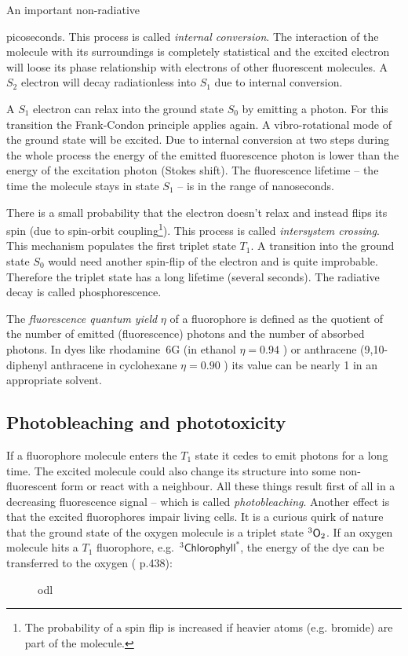 An important non-radiative 

picoseconds. This process is called \emph{internal conversion}. The
interaction of the molecule with its surroundings is completely
statistical and the excited electron will loose its phase relationship
with electrons of other fluorescent molecules. A $S_2$ electron will
decay radiationless into $S_1$ due to internal conversion.

A $S_1$ electron can relax into the ground state $S_0$ by emitting a
photon. For this transition the Frank-Condon principle applies
again. A vibro-rotational mode of the ground state will be excited.
Due to internal conversion at two steps during the whole process the
energy of the emitted fluorescence photon is lower than the energy of
the excitation photon (Stokes shift). The fluorescence lifetime -- the
time the molecule stays in state $S_1$ -- is in the range of
nanoseconds.

There is a small probability that the electron doesn't relax and
instead flips its spin (due to spin-orbit coupling\footnote{The
  probability of a spin flip is increased if heavier atoms
  (e.g. bromide) are part of the molecule.}). This process is called
\emph{intersystem crossing}. This mechanism populates the first
triplet state $T_1$. A transition into the ground state $S_0$ would
need another spin-flip of the electron and is quite
improbable. Therefore the triplet state has a long lifetime (several
seconds). The radiative decay is called phosphorescence.
  
The \emph{fluorescence quantum yield} $\eta$ of a fluorophore is
defined as the quotient of the number of emitted (fluorescence)
photons and the number of absorbed photons. In dyes like rhodamine~6G
(in ethanol $\eta=0.94$ \cite{Fischer1996}) or anthracene
(9,10-diphenyl anthracene in cyclohexane $\eta=0.90$ \cite{Hamai1983})
its value can be nearly 1 in an appropriate solvent.

\subsection{Photobleaching and phototoxicity}
    
If a fluorophore molecule enters the $T_1$ state it cedes to emit
photons for a long time. The excited molecule could also change its
structure into some non-fluorescent form or react with a
neighbour. All these things result first of all in a decreasing
fluorescence signal -- which is called \emph{photobleaching}.  Another
effect is that the excited fluorophores impair living cells.  It is a
curious quirk of nature that the ground state of the oxygen molecule
is a triplet state ${}^3\textsf{O}_2$.  If an oxygen molecule hits a $T_1$
fluorophore, e.g.\ ${}^3\textsf{Chlorophyll}^*$, the energy of the dye
can be transferred to the oxygen (\cite{Haken2006} p.438):
\begin{figure}[!hbt]
  \centering
  
  \caption{odl}
  \label{fig:oxygen}
\end{figure}

